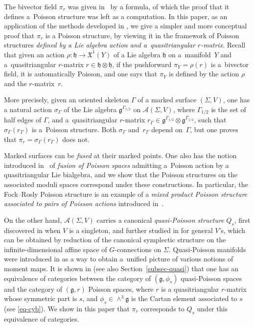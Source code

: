 \documentclass[pdftex]{sigma}
\numberwithin{equation}{section}
\newcommand{\XX}{\mathfrak{X}}
\def \g {\mathfrak{a}}
\def \g {\mathfrak{g}}
\def \h {\mathfrak{h}}
\def \A {{\mathcal{A}}}
\def \sGam {{\scriptscriptstyle \Gamma}}
\newcommand{\piY}{{\pi_{\scriptscriptstyle Y}}}
\begin{document}
The bivector f\/ield $\pi_r$ was given in~\cite{FR2, FR1} by a formula, of which the proof that it def\/ines a~Poisson structure was left as a computation. In this paper, as an application of the methods developed in \cite{Lu-Mou:mixed}, we give a simpler and more conceptual proof that $\pi_r$ is a Poisson structure, by viewing it in the framework of Poisson structures {\it defined by a Lie algebra action and a~quasitriangular $r$-matrix}. Recall that given an action $\rho\colon \h \to \XX^1(Y)$ of a Lie algebra $\h$ on a~mani\-fold~$Y$ and a~quasitriangular $r$-matrix $r \in \h \otimes \h$, if the pushforward $\piY= \rho(r)$ is a~bivector f\/ield, it is automatically Poisson, and one says that $\piY$ is def\/ined by the action $\rho$ and the $r$-mat\-rix~$r$.

More precisely, given an oriented skeleton $\Gamma$ of a marked surface $(\Sigma, V)$, one has a natural action $\sigma_\sGam$ of the Lie algebra $\g^{\sGam_{1/2}}$ on $\A(\Sigma, V)$, where $\Gamma_{1/2}$ is the set of half edges of $\Gamma$, and a~quasitriangular $r$-matrix $r_\sGam \in \g^{\sGam_{1/2}} \otimes \g^{\sGam_{1/2}}$, such that $\sigma_\sGam(r_\sGam)$ is a~Poisson structure. Both $\sigma_\sGam$ and~$r_\sGam$ depend on~$\Gamma$, but one proves that $\pi_r = \sigma_\sGam(r_\sGam)$ does not.

Marked surfaces can be {\it fused} at their marked points. One also has the notion introduced in~\cite{Lu-Mou:mixed} of {\it fusion of Poisson spaces} admitting a~Poisson action by a quasitriangular Lie bialgebra, and we show that the Poisson structures on the associated moduli spaces correspond under these constructions. In particular, the Fock--Rosly Poisson structure is an example of a {\it mixed product Poisson structure associated to pairs of Poisson actions} introduced in~\cite{Lu-Mou:mixed}.

On the other hand, $\A(\Sigma, V)$ carries a canonical {\it quasi-Poisson structure} $Q_s$, f\/irst discovered in \cite{mass-turaev} when $V$ is a singleton, and further studied in \cite{LBS1} for general $V$'s, which can be obtained by reduction of the canonical symplectic structure on the inf\/inite-dimensional af\/f\/ine space of $G$-connections on $\Sigma$. Quasi-Poisson manifolds were introduced in \cite{Anton-Yvette, AA} as a way to obtain a~unif\/ied picture of various notions of moment maps. It is shown in \cite{Anton-Yvette, David-Severa:quasi-Hamiltonian-groupoids, Lu-Mou:mixed} (see also Section~\ref{subsec-quasi}) that one has an equivalence of categories between the category of $(\g, \phi_s)$ quasi-Poisson spaces and the category of $(\g, r)$ Poisson spaces, where $r$ is a quasitriangular $r$-matrix whose symmetric part is $s$, and $\phi_s \in \wedge^3 \g$ is the Cartan element associated to $s$ (see \eqref{eq-cyb}). We show in this paper that $\pi_r$ corresponds to $Q_s$ under this equivalence of categories.
\end{document}
